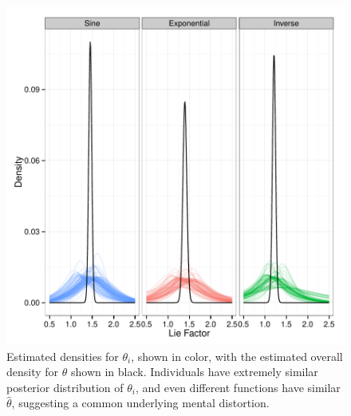 \documentclass[journal]{vgtc}\usepackage{graphicx, color}
\begin{document}
\begin{figure}\centering
\includegraphics[width=\linewidth]{figure/fig-spaghettiIndivDists}
\caption{Estimated densities for $\theta_i$, shown in color, with the estimated overall density for $\theta$ shown in black. Individuals have extremely similar posterior distribution of $\theta_i$, and even different functions have similar $\hat\theta$, suggesting a common underlying mental distortion.}\label{fig:overalldensity}
\end{figure}
\end{document}
